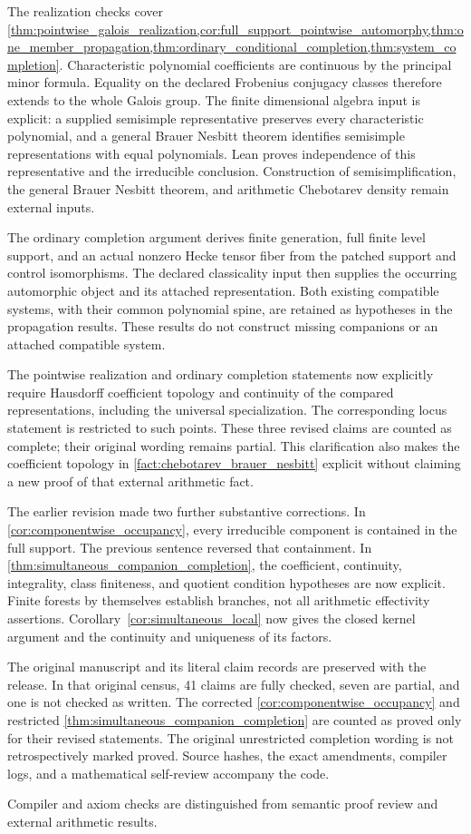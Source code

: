 \documentclass[11pt]{amsart}
\theoremstyle{definition}
\theoremstyle{remark}
\begin{document}
The realization checks cover \cref{thm:pointwise_galois_realization,cor:full_support_pointwise_automorphy,thm:one_member_propagation,thm:ordinary_conditional_completion,thm:system_completion}. Characteristic polynomial coefficients are continuous by the principal minor formula. Equality on the declared Frobenius conjugacy classes therefore extends to the whole Galois group. The finite dimensional algebra input is explicit: a supplied semisimple representative preserves every characteristic polynomial, and a general Brauer Nesbitt theorem identifies semisimple representations with equal polynomials. Lean proves independence of this representative and the irreducible conclusion. Construction of semisimplification, the general Brauer Nesbitt theorem, and arithmetic Chebotarev density remain external inputs.

The ordinary completion argument derives finite generation, full finite level support, and an actual nonzero Hecke tensor fiber from the patched support and control isomorphisms. The declared classicality input then supplies the occurring automorphic object and its attached representation. Both existing compatible systems, with their common polynomial spine, are retained as hypotheses in the propagation results. These results do not construct missing companions or an attached compatible system.

The pointwise realization and ordinary completion statements now explicitly require Hausdorff coefficient topology and continuity of the compared representations, including the universal specialization. The corresponding locus statement is restricted to such points. These three revised claims are counted as complete; their original wording remains partial. This clarification also makes the coefficient topology in \cref{fact:chebotarev_brauer_nesbitt} explicit without claiming a new proof of that external arithmetic fact.

The earlier revision made two further substantive corrections. In \cref{cor:componentwise_occupancy}, every irreducible component is contained in the full support. The previous sentence reversed that containment. In \cref{thm:simultaneous_companion_completion}, the coefficient, continuity, integrality, class finiteness, and quotient condition hypotheses are now explicit. Finite forests by themselves establish branches, not all arithmetic effectivity assertions. Corollary~\ref{cor:simultaneous_local} now gives the closed kernel argument and the continuity and uniqueness of its factors.

The original manuscript and its literal claim records are preserved with the release. In that original census, 41 claims are fully checked, seven are partial, and one is not checked as written. The corrected \cref{cor:componentwise_occupancy} and restricted \cref{thm:simultaneous_companion_completion} are counted as proved only for their revised statements. The original unrestricted completion wording is not retrospectively marked proved. Source hashes, the exact amendments, compiler logs, and a mathematical self-review accompany the code.

Compiler and axiom checks are distinguished from semantic proof review and external arithmetic results.



\end{document}
